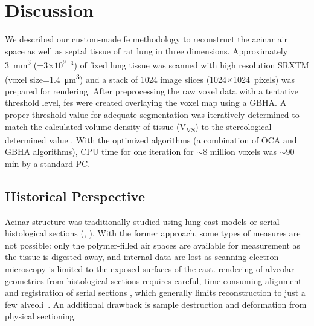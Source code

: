 \section{Discussion}\label{sec:discussion}
We described our custom-made \ac{fe} methodology to reconstruct the acinar air space as well as septal tissue of rat lung in three dimensions. Approximately \SI{3}{\milli\meter\cubed} (=3$\times10^9$~\micro\meter$^3$) of fixed lung tissue was scanned with high resolution \ac{SRXTM} (voxel size=\SI{1.4}{\micro\meter\cubed}) and a stack of 1024 image slices (1024$\times$1024~pixels) was prepared for \threed rendering. After preprocessing the raw voxel data with a tentative threshold level, \threed \ac{fe}s were created overlaying the voxel map using a \ac{GBHA}. A proper threshold value for adequate segmentation was iteratively determined to match the calculated volume density of tissue (V\textsubscript{VS}) to the stereological determined value \cite{Tschanz2003}. With the optimized algorithms (a combination of \ac{OCA} and \ac{GBHA} algorithms), \acs{CPU} time for one iteration for $\sim$8 million voxels was $\sim$90 min by a standard \acs{PC}.

\subsection{Historical Perspective}
Acinar structure was traditionally studied using lung cast models \cite{Boyden1971,Haefeli1988,Schreider1981} or serial histological sections (\eg, \cite{Berend1991,Hansen1975,Hansen1975a,Parker1971,Randell1989}). With the former approach, some types of measures are not possible: only the polymer-filled air spaces are available for measurement as the tissue is digested away, and internal data are lost as scanning electron microscopy is limited to the exposed surfaces of the cast. \threed rendering of alveolar geometries from histological sections requires careful, time-consuming alignment and registration of serial \twod sections \cite{Mercer1987,Mercer1987a,Stelter1966}, which generally limits reconstruction to just a few alveoli~\cite{Mercer1987}. An additional drawback is sample destruction and deformation from physical sectioning.

